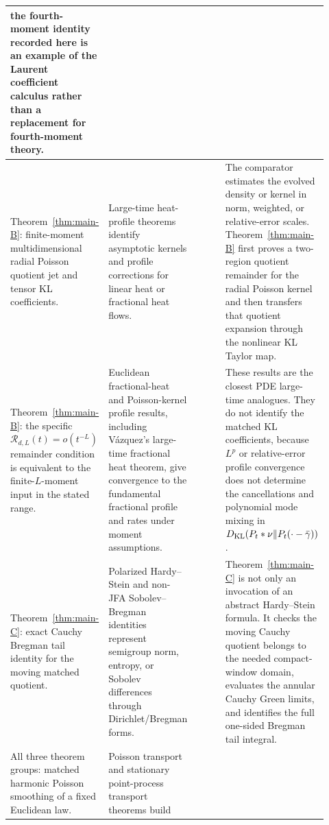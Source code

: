 {\begin{longtable}{>{\raggedright\arraybackslash}p{0.22\linewidth}|%
>{\raggedright\arraybackslash}p{0.24\linewidth}|%
>{\raggedright\arraybackslash}p{0.14\linewidth}|%
>{\raggedright\arraybackslash}p{0.32\linewidth}}
the fourth-moment identity recorded here is an example of the Laurent
coefficient calculus rather than a replacement for fourth-moment theory.\\
\hline
Theorem~\ref{thm:main-B}: finite-moment multidimensional radial Poisson
quotient jet and tensor KL coefficients.
& Large-time heat-profile theorems identify asymptotic kernels and profile
corrections for linear heat or fractional heat flows.
& \cite{EscobedoZuazua1991,AnkerPapageorgiouZhang2023HeatSymmetricSpaces,
Vazquez2018FractionalHeatEuclidean,
IshigeKawakamiMichihisa2017,
IshigeKawakamiMichihisa2022RefinedFractional}
& The comparator estimates the evolved density or kernel in norm, weighted,
or relative-error scales.  Theorem~\ref{thm:main-B} first proves a
two-region quotient remainder for the radial Poisson kernel and then transfers
that quotient expansion through the nonlinear KL Taylor map.\\
\hline
Theorem~\ref{thm:main-B}: the specific
\(\mathcal R_{d,L}(t)=o(t^{-L})\) remainder condition is equivalent to the
finite-\(L\)-moment input in the stated range.
& Euclidean fractional-heat and Poisson-kernel profile results, including
V{\'a}zquez's large-time fractional heat theorem, give convergence to the
fundamental fractional profile and rates under moment assumptions.
& \cite{Vazquez2018FractionalHeatEuclidean,
FilaIshigeKawakami2012PoissonKernel,
Iwabuchi2015CriticalBurgersPoisson,
Papageorgiou2024FractionalLargeTime}
& These results are the closest PDE large-time analogues.  They do not
identify the matched KL coefficients, because \(L^p\) or relative-error
profile convergence does not determine the cancellations and polynomial mode
mixing in
\(D_{\rm KL}(P_t*\nu\|P_t(\cdot-\bar\gamma))\).\\
\hline
Theorem~\ref{thm:main-C}: exact Cauchy Bregman tail identity for the
moving matched quotient.
& Polarized Hardy--Stein and non-JFA Sobolev--Bregman identities represent
semigroup norm, entropy, or Sobolev differences through Dirichlet/Bregman
forms.
& \cite{BogdanGutowskiPietruskaPaluba2025PolarizedHardyStein,
GutowskiKwasnicki2025BeurlingDenySobolevBregman}
& Theorem~\ref{thm:main-C} is not only an invocation of an abstract
Hardy--Stein formula.  It checks the moving Cauchy quotient belongs to the
needed compact-window domain, evaluates the annular Cauchy Green limits, and
identifies the full one-sided Bregman tail integral.\\
\hline
All three theorem groups: matched harmonic Poisson smoothing of a fixed
Euclidean law.
& Poisson transport and stationary point-process transport theorems build

\end{longtable}}
